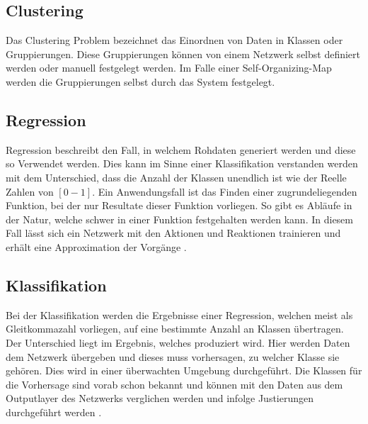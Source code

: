 \subsection{Clustering}
\label{subsec:Clustering}

Das Clustering Problem bezeichnet das Einordnen von Daten in Klassen oder Gruppierungen. 
Diese Gruppierungen können von einem Netzwerk selbst definiert werden oder manuell festgelegt werden. 
Im Falle einer Self-Organizing-Map werden die Gruppierungen selbst durch das System festgelegt.

\subsection{Regression}
\label{subsec:Regression}

Regression beschreibt den Fall, in welchem Rohdaten generiert werden und diese so Verwendet werden. 
Dies kann im Sinne einer Klassifikation verstanden werden mit dem Unterschied, dass die Anzahl der Klassen unendlich ist wie der Reelle Zahlen von $[0 - 1]$. 
Ein Anwendungsfall ist das Finden einer zugrundeliegenden Funktion, bei der nur Resultate dieser Funktion vorliegen. 
So gibt es Abläufe in der Natur, welche schwer in einer Funktion festgehalten werden kann. 
In diesem Fall lässt sich ein Netzwerk mit den Aktionen und Reaktionen trainieren und erhält eine Approximation der Vorgänge \cite{bishop2006pattern}.

\subsection{Klassifikation}
\label{subsec:Classification}

Bei der Klassifikation werden die Ergebnisse einer Regression, welchen meist als Gleitkommazahl vorliegen, auf eine bestimmte Anzahl an Klassen übertragen. 
Der Unterschied liegt im Ergebnis, welches produziert wird.  
Hier werden Daten dem Netzwerk übergeben und dieses muss vorhersagen, zu welcher Klasse sie gehören. Dies wird in einer überwachten Umgebung durchgeführt. 
Die Klassen für die Vorhersage sind vorab schon bekannt und können mit den Daten aus dem Outputlayer des Netzwerks verglichen werden und infolge Justierungen durchgeführt werden \cite{AI3}. \\

